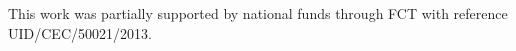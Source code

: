 \section*{\acknowledgments}


This work was partially supported by national funds through FCT with reference UID/CEC/50021/2013. 


\cleardoublepage
